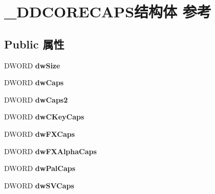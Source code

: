 \hypertarget{struct___d_d_c_o_r_e_c_a_p_s}{}\section{\+\_\+\+D\+D\+C\+O\+R\+E\+C\+A\+P\+S结构体 参考}
\label{struct___d_d_c_o_r_e_c_a_p_s}
\subsection*{Public 属性}
\begin{DoxyCompactItemize}
\item 
\mbox{\label{struct___d_d_c_o_r_e_c_a_p_s_a3b5b223a74fa60e99d0e498115a9aac5}} 
D\+W\+O\+RD {\bfseries dw\+Size}
\item 
\mbox{\label{struct___d_d_c_o_r_e_c_a_p_s_a58c9791ff2e2442b8e4c9691778040bb}} 
D\+W\+O\+RD {\bfseries dw\+Caps}
\item 
\mbox{\label{struct___d_d_c_o_r_e_c_a_p_s_a4091d2042f1a79e8748819a19d4cc1fc}} 
D\+W\+O\+RD {\bfseries dw\+Caps2}
\item 
\mbox{\label{struct___d_d_c_o_r_e_c_a_p_s_a973dd5dfdf57e2a74de7b39c26c968a6}} 
D\+W\+O\+RD {\bfseries dw\+C\+Key\+Caps}
\item 
\mbox{\label{struct___d_d_c_o_r_e_c_a_p_s_adf3fd91f078520a796de990a875ffc87}} 
D\+W\+O\+RD {\bfseries dw\+F\+X\+Caps}
\item 
\mbox{\label{struct___d_d_c_o_r_e_c_a_p_s_aae4d59ebede54ba67e8dde28e0dd703e}} 
D\+W\+O\+RD {\bfseries dw\+F\+X\+Alpha\+Caps}
\item 
\mbox{\label{struct___d_d_c_o_r_e_c_a_p_s_addd8ae1f5dee5696c40ee8bd42a6fd29}} 
D\+W\+O\+RD {\bfseries dw\+Pal\+Caps}
\item 
\mbox{\label{struct___d_d_c_o_r_e_c_a_p_s_ad0252e545c3955a2df7e5002ba47f241}} 
D\+W\+O\+RD {\bfseries dw\+S\+V\+Caps}
\item 
\mbox{\label{struct___d_d_c_o_r_e_c_a_p_s_a34438ca680902eb03e9ecf29de739746}} 

\end{DoxyCompactItemize}
